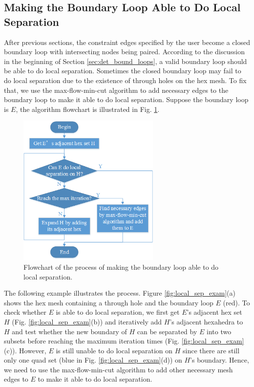 \documentclass[final,5p,times,twocolumn]{elsarticle}
\begin{document}
\subsection{Making the Boundary Loop Able to Do Local Separation}
\label{sec:local_separation}
After previous sections, the constraint edges specified by the user become a closed boundary loop with intersecting nodes being paired. According to the discussion in the beginning of Section \ref{sec:det_bound_loops}, a valid boundary loop should be able to do local separation. Sometimes the closed boundary loop may fail to do local separation due to the existence of through holes on the hex mesh. To fix that, we use the max-flow-min-cut algorithm to add necessary edges to the boundary loop to make it able to do local separation. Suppose the boundary loop is $E$, the algorithm flowchart is illustrated in Fig. \ref{fig:flow_local_sep}.

\begin{figure}[htbp]
\begin{center}
\includegraphics[width=7cm]{flow_local_separation.png}
\caption{Flowchart of the process of making the boundary loop able to do local separation.}
\label{fig:flow_local_sep}
\end{center}
\end{figure}

The following example illustrates the process. Figure \ref{fig:local_sep_exam}(a) shows the hex mesh containing a through hole and the boundary loop $E$ (red). To check whether $E$ is able to do local separation, we first get $E$'s adjacent hex set $H$ (Fig. \ref{fig:local_sep_exam}(b)) and iteratively add $H$'s adjacent hexahedra to $H$ and test whether the new boundary of $H$ can be separated by $E$ into two subsets before reaching the maximum iteration times (Fig. \ref{fig:local_sep_exam}(c)). However, $E$ is still unable to do local separation on $H$ since there are still only one quad set (blue in Fig. \ref{fig:local_sep_exam}(d)) on $H$'s boundary. Hence, we need to use the max-flow-min-cut algorithm to add other necessary mesh edges to $E$ to make it able to do local separation.
\end{document}
